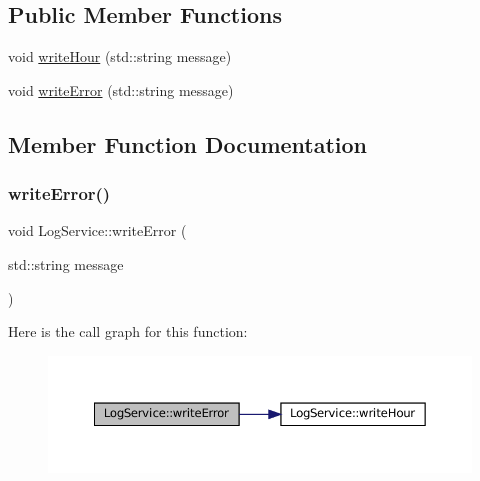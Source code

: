 \subsection*{Public Member Functions}
\begin{DoxyCompactItemize}
\item 
void \mbox{\hyperlink{classLogService_a887c03cf21e388b6951bd10c2bc234e5}{write\+Hour}} (std\+::string message)
\item 
void \mbox{\hyperlink{classLogService_a3c84c2c99960d5ec2087390cfea576d6}{write\+Error}} (std\+::string message)
\end{DoxyCompactItemize}


\subsection{Member Function Documentation}
\mbox{\label{classLogService_a3c84c2c99960d5ec2087390cfea576d6}} 
\subsubsection{\texorpdfstring{write\+Error()}{writeError()}}
{\footnotesize\ttfamily void Log\+Service\+::write\+Error (\begin{DoxyParamCaption}\item[{std\+::string}]{message }\end{DoxyParamCaption})\hspace{0.3cm}{\ttfamily [inline]}}

Here is the call graph for this function\+:
\nopagebreak
\begin{figure}[H]
\begin{center}
\leavevmode
\includegraphics[width=350pt]{classLogService_a3c84c2c99960d5ec2087390cfea576d6_cgraph}
\end{center}
\end{figure}
\mbox{\label{classLogService_a887c03cf21e388b6951bd10c2bc234e5}} 
